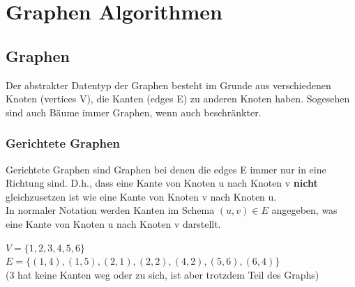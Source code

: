 \documentclass[
../../AuD-Zusammenfassung.tex,
]
{subfiles}
\begin{document}
\section{Graphen Algorithmen}
\subsection{Graphen}
Der abstrakter Datentyp der Graphen besteht im Grunde aus verschiedenen Knoten (vertices V), die Kanten (edges E) zu anderen Knoten haben. Sogesehen sind auch Bäume immer Graphen, wenn auch beschränkter.
\subsubsection{Gerichtete Graphen}
Gerichtete Graphen sind Graphen bei denen die edges E immer nur in eine Richtung sind. D.h., dass eine Kante von Knoten u nach Knoten v \textbf{nicht} gleichzusetzen ist wie eine Kante von Knoten v nach Knoten u. \\
In normaler Notation werden Kanten im Schema $(u,v)\in E$ angegeben, was eine Kante von Knoten u nach Knoten v darstellt.

\begin{minipage}[t]{\textwidth}
    \centering
    $V = \{1,2,3,4,5,6\}$\\
    $E = \{(1,4),(1,5),(2,1),(2,2),(4,2),(5,6),(6,4)\}$\\
    (3 hat keine Kanten weg oder zu sich, ist aber trotzdem Teil des Graphs)
\end{minipage}
\end{document}
